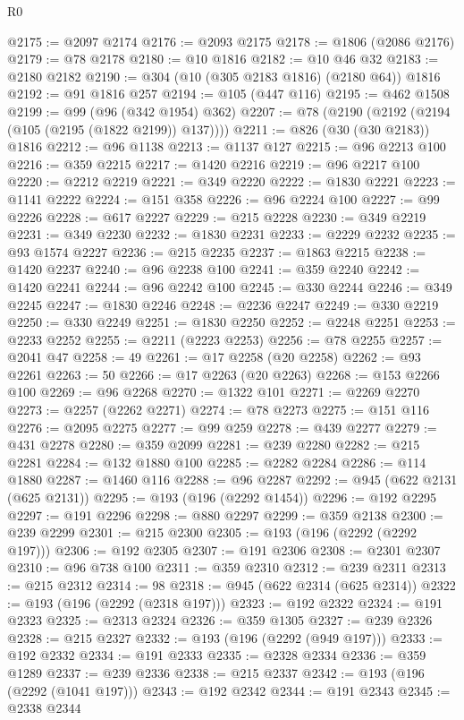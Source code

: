 \begin{lexlean}{R0}
\begin{coremodule}
@2175 := @2097 @2174
@2176 := @2093 @2175
@2178 := @1806 (@2086 @2176)
@2179 := @78 @2178
@2180 := @10 @1816
@2182 := @10 @46 @32
@2183 := @2180 @2182
@2190 := @304 (@10 (@305 @2183 @1816) (@2180 @64)) @1816
@2192 := @91 @1816 @257
@2194 := @105 (@447 @116)
@2195 := @462 @1508
@2199 := @99 (@96 (@342 @1954) @362)
@2207 := @78 (@2190 (@2192 (@2194 (@105 (@2195 (@1822 @2199)) @137))))
@2211 := @826 (@30 (@30 @2183)) @1816
@2212 := @96 @1138
@2213 := @1137 @127
@2215 := @96 @2213 @100
@2216 := @359 @2215
@2217 := @1420 @2216
@2219 := @96 @2217 @100
@2220 := @2212 @2219
@2221 := @349 @2220
@2222 := @1830 @2221
@2223 := @1141 @2222
@2224 := @151 @358
@2226 := @96 @2224 @100
@2227 := @99 @2226
@2228 := @617 @2227
@2229 := @215 @2228
@2230 := @349 @2219
@2231 := @349 @2230
@2232 := @1830 @2231
@2233 := @2229 @2232
@2235 := @93 @1574 @2227
@2236 := @215 @2235
@2237 := @1863 @2215
@2238 := @1420 @2237
@2240 := @96 @2238 @100
@2241 := @359 @2240
@2242 := @1420 @2241
@2244 := @96 @2242 @100
@2245 := @330 @2244
@2246 := @349 @2245
@2247 := @1830 @2246
@2248 := @2236 @2247
@2249 := @330 @2219
@2250 := @330 @2249
@2251 := @1830 @2250
@2252 := @2248 @2251
@2253 := @2233 @2252
@2255 := @2211 (@2223 @2253)
@2256 := @78 @2255
@2257 := @2041 @47
@2258 := 49
@2261 := @17 @2258 (@20 @2258)
@2262 := @93 @2261
@2263 := 50
@2266 := @17 @2263 (@20 @2263)
@2268 := @153 @2266 @100
@2269 := @96 @2268
@2270 := @1322 @101
@2271 := @2269 @2270
@2273 := @2257 (@2262 @2271)
@2274 := @78 @2273
@2275 := @151 @116
@2276 := @2095 @2275
@2277 := @99 @259
@2278 := @439 @2277
@2279 := @431 @2278
@2280 := @359 @2099
@2281 := @239 @2280
@2282 := @215 @2281
@2284 := @132 @1880 @100
@2285 := @2282 @2284
@2286 := @114 @1880
@2287 := @1460 @116
@2288 := @96 @2287
@2292 := @945 (@622 @2131 (@625 @2131))
@2295 := @193 (@196 (@2292 @1454))
@2296 := @192 @2295
@2297 := @191 @2296
@2298 := @880 @2297
@2299 := @359 @2138
@2300 := @239 @2299
@2301 := @215 @2300
@2305 := @193 (@196 (@2292 (@2292 @197)))
@2306 := @192 @2305
@2307 := @191 @2306
@2308 := @2301 @2307
@2310 := @96 @738 @100
@2311 := @359 @2310
@2312 := @239 @2311
@2313 := @215 @2312
@2314 := 98
@2318 := @945 (@622 @2314 (@625 @2314))
@2322 := @193 (@196 (@2292 (@2318 @197)))
@2323 := @192 @2322
@2324 := @191 @2323
@2325 := @2313 @2324
@2326 := @359 @1305
@2327 := @239 @2326
@2328 := @215 @2327
@2332 := @193 (@196 (@2292 (@949 @197)))
@2333 := @192 @2332
@2334 := @191 @2333
@2335 := @2328 @2334
@2336 := @359 @1289
@2337 := @239 @2336
@2338 := @215 @2337
@2342 := @193 (@196 (@2292 (@1041 @197)))
@2343 := @192 @2342
@2344 := @191 @2343
@2345 := @2338 @2344

\end{coremodule}
\end{lexlean}
